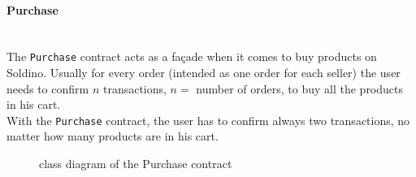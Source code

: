 \paragraph{Purchase}\mbox{}\\ 

\noindent The \texttt{Purchase} contract acts as a façade when it comes to buy products on Soldino.
Usually for every order (intended as one order for each seller) the user needs to confirm $n$ transactions, $n =$ number of orders, to buy all the products in his cart.\\
With the \texttt{Purchase} contract, the user has to confirm always two transactions, no matter how many products are in his cart. 
\begin{figure}[H]
	\centering
	\caption{class diagram of the Purchase contract}
\end{figure}